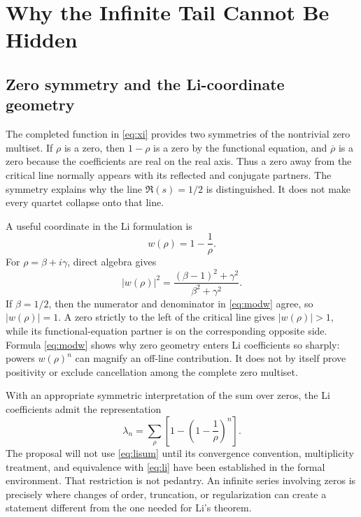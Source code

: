 \documentclass[conference]{../../../../Conference-LaTeX-template_10-17-19/IEEEtran}
\begin{document}
\section{Why the Infinite Tail Cannot Be Hidden}
\subsection{Zero symmetry and the Li-coordinate geometry}
The completed function in \eqref{eq:xi} provides two symmetries of the nontrivial zero multiset. If $\rho$ is a zero, then $1-\rho$ is a zero by the functional equation, and $\overline{\rho}$ is a zero because the coefficients are real on the real axis. Thus a zero away from the critical line normally appears with its reflected and conjugate partners. The symmetry explains why the line $\Re(s)=1/2$ is distinguished. It does not make every quartet collapse onto that line.

A useful coordinate in the Li formulation is
\begin{equation}
 w(\rho)=1-\frac{1}{\rho}.
\label{eq:wmap}
\end{equation}
For $\rho=\beta+i\gamma$, direct algebra gives
\begin{equation}
 |w(\rho)|^2=\frac{(\beta-1)^2+\gamma^2}{\beta^2+\gamma^2}.
\label{eq:modw}
\end{equation}
If $\beta=1/2$, then the numerator and denominator in \eqref{eq:modw} agree, so $|w(\rho)|=1$. A zero strictly to the left of the critical line gives $|w(\rho)|>1$, while its functional-equation partner is on the corresponding opposite side. Formula \eqref{eq:modw} shows why zero geometry enters Li coefficients so sharply: powers $w(\rho)^n$ can magnify an off-line contribution. It does not by itself prove positivity or exclude cancellation among the complete zero multiset.

With an appropriate symmetric interpretation of the sum over zeros, the Li coefficients admit the representation
\begin{equation}
 \lambda_n=\sum_{\rho}\left[1-\left(1-\frac{1}{\rho}\right)^n\right].
\label{eq:lisum}
\end{equation}
The proposal will not use \eqref{eq:lisum} until its convergence convention, multiplicity treatment, and equivalence with \eqref{eq:li} have been established in the formal environment. That restriction is not pedantry. An infinite series involving zeros is precisely where changes of order, truncation, or regularization can create a statement different from the one needed for Li's theorem.
\end{document}
